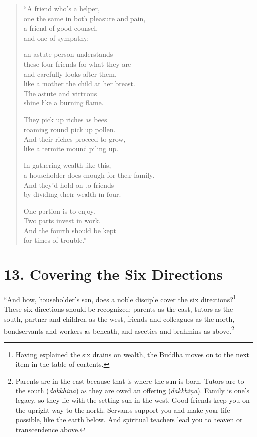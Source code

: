 \documentclass[12pt,openany]{book}%
\begin{document}
\begin{verse}%
“A friend who’s a helper, \\
one the same in both pleasure and pain, \\
a friend of good counsel, \\
and one of sympathy; 

an astute person understands \\
these four friends for what they are \\
and carefully looks after them, \\
like a mother the child at her breast. \\
The astute and virtuous \\
shine like a burning flame. 

They pick up riches as bees \\
roaming round pick up pollen. \\
And their riches proceed to grow, \\
like a termite mound piling up. 

In gathering wealth like this, \\
a householder does enough for their family. \\
And they’d hold on to friends \\
by dividing their wealth in four. 

One portion is to enjoy. \\
Two parts invest in work. \\
And the fourth should be kept \\
for times of trouble.” 

%
\end{verse}

\section*{13. Covering the Six Directions }

“And how, householder’s son, does a noble disciple cover the six directions?\footnote{Having explained the six drains on wealth, the Buddha moves on to the next item in the table of contents. } These six directions should be recognized: parents as the east, tutors as the south, partner and children as the west, friends and colleagues as the north, bondservants and workers as beneath, and ascetics and brahmins as above.\footnote{Parents are in the east because that is where the sun is born. Tutors are to the south (\textit{\textsanskrit{dakkhiṇā}}) as they are owed an offering (\textit{\textsanskrit{dakkhiṇā}}). Family is one’s legacy, so they lie with the setting sun in the west. Good friends keep you on the upright way to the north. Servants support you and make your life possible, like the earth below. And spiritual teachers lead you to heaven or transcendence above. } 
\end{document}
